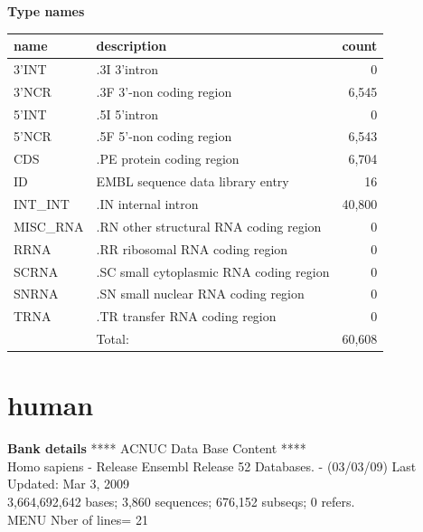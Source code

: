 \documentclass{article}
\begin{document}
\begin{Schunk}
\textbf{Type names}
\noindent\begin{tabular}{llr}
\hline \hline
name & description & count \\
\hline
3'INT  &  .3I 3'intron  &  0 \\
3'NCR  &  .3F  3'-non coding region  &  6,545 \\
5'INT  &  .5I 5'intron  &  0 \\
5'NCR  &  .5F  5'-non coding region  &  6,543 \\
CDS  &  .PE protein coding region  &  6,704 \\
ID  &  EMBL sequence data library entry  &  16 \\
INT\_INT  &  .IN  internal intron  &  40,800 \\
MISC\_RNA  &  .RN other structural RNA coding region  &  0 \\
RRNA  &  .RR ribosomal RNA coding region  &  0 \\
SCRNA  &  .SC small cytoplasmic RNA coding region  &  0 \\
SNRNA  &  .SN small nuclear RNA coding region  &  0 \\
TRNA  &  .TR transfer RNA coding region  &  0 \\
\hline
 & Total: & 60,608 \\
\hline \hline
\end{tabular}

\section{ human }
\textbf{Bank details}
             ****     ACNUC Data Base Content      ****                         \\
Homo sapiens - Release Ensembl Release 52 Databases. - (03/03/09) Last Updated: Mar  3, 2009\\
3,664,692,642 bases; 3,860 sequences; 676,152 subseqs; 0 refers.\\
MENU Nber of lines= 21                                                         


\end{Schunk}
\end{document}
